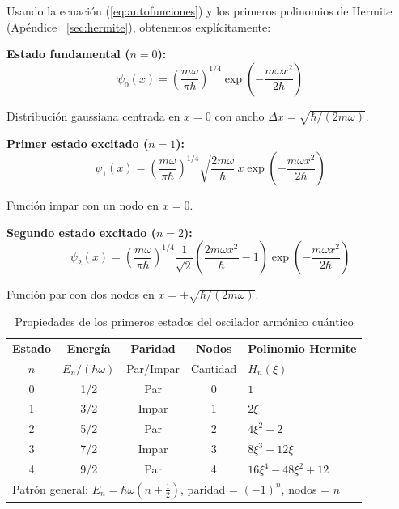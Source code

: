 \documentclass[11pt,a4paper,spanish]{book}
\begin{document}
Usando la ecuación (\ref{eq:autofunciones}) y los primeros polinomios de Hermite (Apéndice ~\ref{sec:hermite}), obtenemos explícitamente:

\textbf{Estado fundamental ($n=0$):}
\begin{equation}
	\psi_0(x) = \left(\frac{m\omega}{\pi\hbar}\right)^{1/4} \exp\left(-\frac{m\omega x^2}{2\hbar}\right)
\end{equation}

Distribución gaussiana centrada en $x=0$ con ancho $\Delta x = \sqrt{\hbar/(2m\omega)}$.

\textbf{Primer estado excitado ($n=1$):}
\begin{equation}
	\psi_1(x) = \left(\frac{m\omega}{\pi\hbar}\right)^{1/4} \sqrt{\frac{2m\omega}{\hbar}} \, x \exp\left(-\frac{m\omega x^2}{2\hbar}\right)
\end{equation}

Función impar con un nodo en $x=0$.

\textbf{Segundo estado excitado ($n=2$):}
\begin{equation}
	\psi_2(x) = \left(\frac{m\omega}{\pi\hbar}\right)^{1/4} \frac{1}{\sqrt{2}}\left(\frac{2m\omega x^2}{\hbar} - 1\right) \exp\left(-\frac{m\omega x^2}{2\hbar}\right)
\end{equation}

Función par con dos nodos en $x = \pm\sqrt{\hbar/(2m\omega)}$.\\

\begin{table}[h]
	\centering
	\caption{Propiedades de los primeros estados del oscilador armónico cuántico}
	\label{tab:estados}
	\begin{tabular}{ccccl}
		\hline
		\textbf{Estado} & \textbf{Energía} & \textbf{Paridad} & \textbf{Nodos} & \textbf{Polinomio Hermite} \\
		$n$ & $E_n/(\hbar\omega)$ & Par/Impar & Cantidad & $H_n(\xi)$ \\
		\hline
		0 & 1/2 & Par & 0 & $1$ \\
		1 & 3/2 & Impar & 1 & $2\xi$ \\
		2 & 5/2 & Par & 2 & $4\xi^2 - 2$ \\
		3 & 7/2 & Impar & 3 & $8\xi^3 - 12\xi$ \\
		4 & 9/2 & Par & 4 & $16\xi^4 - 48\xi^2 + 12$ \\
		\hline
		\multicolumn{5}{l}{Patrón general: $E_n = \hbar\omega(n + \frac{1}{2})$, paridad = $(-1)^n$, nodos = $n$}
	\end{tabular}
\end{table}
\end{document}
